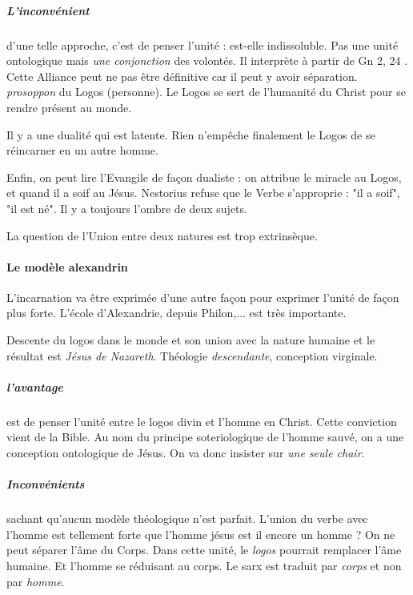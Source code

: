 \subparagraph{L'inconvénient} d'une telle approche, c'est de penser l'unité : est-elle indissoluble. Pas une unité ontologique mais \textit{une conjonction} des volontés. Il interprète à partir de Gn 2, 24 .
Cette Alliance peut ne pas être définitive car il peut y avoir séparation. \textit{prosoppon} du Logos (personne). Le Logos se sert de l'humanité du Christ pour se rendre présent au monde.

Il y a une dualité qui est latente. Rien n'empêche finalement le Logos de se réincarner en un autre homme.


Enfin, on peut lire l'Evangile de façon dualiste : on attribue le miracle au Logos, et quand il a soif au Jésus. 
Nestorius refuse que le Verbe s'approprie : "il a soif", "il est né". Il y a toujours l'ombre de deux sujets. 

La question de l'Union entre deux natures  est trop extrinsèque.



\paragraph{Le modèle alexandrin}
  
L'incarnation va être exprimée d'une autre façon pour exprimer l'unité de façon plus forte. L'école d'Alexandrie, depuis Philon,... est très importante.

Descente du logos dans le monde et son union avec la nature humaine et le résultat est \textit{Jésus de Nazareth}. Théologie \textit{descendante}, conception virginale.

\subparagraph{l'avantage} est de penser l'unité entre le logos divin et l'homme en Christ. Cette conviction vient de la Bible. Au nom du principe soteriologique de l'homme sauvé, on a une conception ontologique de Jésus.
On va donc insister sur \textit{une seule chair}.

\subparagraph{Inconvénients} sachant qu'aucun modèle théologique n'est parfait. L'union du verbe avec l'homme est tellement forte que l'homme jésus est il encore un homme ? On ne peut séparer l'âme du Corps. Dans cette unité, le \textit{logos} pourrait remplacer l'âme humaine. Et l'homme se réduisant au corps. Le sarx est traduit par \textit{corps} et non par \textit{homme}. 

